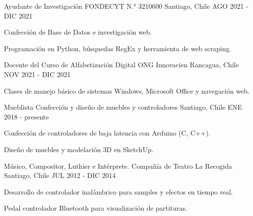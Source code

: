 \begin{cventries}
  \cventry
    {Ayudante de Investigación} %
    {FONDECYT N.° 3210600} %
    {Santiago, Chile} %
    {AGO 2021 - DIC 2021} %
    {
      \begin{cvitems} %
        \item {Confección de Base de Datos e investigación web.}
        \item {Programación en Python, búsquedas RegEx y herramienta de web scraping.}
      \end{cvitems}
    }

  \cventry
    {Docente del Curso de Alfabetización Digital} %
    {ONG Innovacien} %
    {Rancagua, Chile} %
    {NOV 2021 - DIC 2021} %
    {
      \begin{cvitems} %
        \item {Clases de manejo básico de sistemas Windows, Microsoft Office y navegación web.}
      \end{cvitems}
    }

  \cventry
    {Mueblista} %
    {Confección y diseño de muebles y controladores} %
    {Santiago, Chile} %
    {ENE 2018 - presente} %
    {
      \begin{cvitems} %
        \item {Confección de controladores  de baja latencia con Arduino (C, C++).}
        \item {Diseño de muebles y modelación 3D en SketchUp.}
      \end{cvitems}
    }

  \cventry
    {Músico, Compositor, Luthier e Intérprete.}
    {Compañía de Teatro La Recogida}
    {Santiago, Chile}
    {JUL 2012 - DIC 2014}
    {
      \begin{cvitems} %
        \item {Desarrollo de controlador  inalámbrico para samples y efectos en tiempo real.}
        \item {Pedal controlador Bluetooth para visualización de partituras.}
      \end{cvitems}
    }   


\end{cventries}
